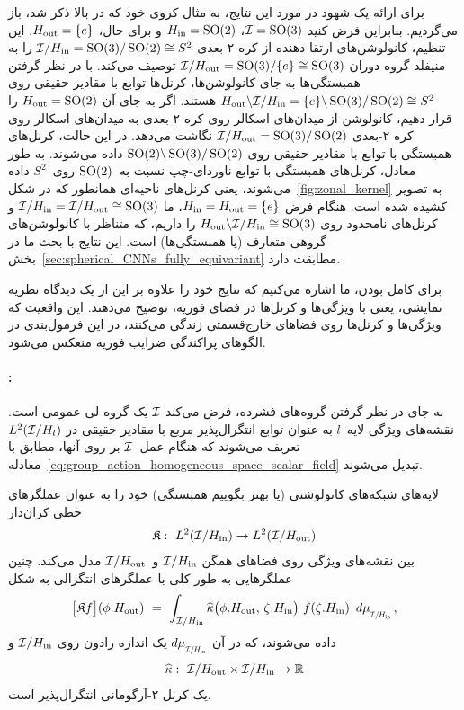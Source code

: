 برای ارائه یک شهود در مورد این نتایج، به مثال  کروی خود که در بالا ذکر شد، باز می‌گردیم.
بنابراین فرض کنید $\mathcal{I}=\operatorname{SO}(3)$، $H_{\textup{in}}=\operatorname{SO}(2)$ و برای حال، $H_{\textup{out}}=\{e\}$.
این تنظیم، کانولوشن‌های ارتقا دهنده از کره ۲-بعدی $\mathcal{I}/H_{\textup{in}} = \operatorname{SO}(3)/\operatorname{SO}(2) \cong S^2$ را به منیفلد گروه دوران $\mathcal{I}/H_{\textup{out}} = \operatorname{SO}(3)/\{e\} \cong \operatorname{SO}(3)$ توصیف می‌کند.
با در نظر گرفتن همبستگی‌ها به جای کانولوشن‌ها، کرنل‌ها توابع با مقادیر حقیقی روی $H_{\textup{out}}\backslash \mathcal{I}/H_{\textup{in}} = \{e\}\backslash \operatorname{SO}(3)/\operatorname{SO}(2) \cong S^2$ هستند.
اگر به جای آن $H_{\textup{out}}=\operatorname{SO}(2)$ را قرار دهیم، کانولوشن از میدان‌های اسکالر روی کره ۲-بعدی به میدان‌های اسکالر روی کره ۲-بعدی $\mathcal{I}/H_{\textup{out}} = \operatorname{SO}(3)/\operatorname{SO}(2)$ نگاشت می‌دهد.
در این حالت، کرنل‌های همبستگی با توابع با مقادیر حقیقی روی $\operatorname{SO}(2)\backslash \operatorname{SO}(3)/\operatorname{SO}(2)$ داده می‌شوند.
به طور معادل، کرنل‌های همبستگی با توابع ناوردای-چپ نسبت به~$\operatorname{SO}(2)$ روی~$S^2$ داده می‌شوند، یعنی کرنل‌های ناحیه‌ای همانطور که در شکل~\ref{fig:zonal_kernel} به تصویر کشیده شده است.
هنگام فرض $H_{\textup{in}}=H_{\textup{out}}=\{e\}$، ما $\mathcal{I}/H_{\textup{in}} = \mathcal{I}/H_{\textup{out}} \cong \operatorname{SO}(3)$ و کرنل‌های نامحدود روی $H_{\textup{out}}\backslash \mathcal{I}/H_{\textup{in}} \cong \operatorname{SO}(3)$ را داریم، که متناظر با کانولوشن‌های گروهی متعارف (یا همبستگی‌ها) است.
این نتایج با بحث ما در بخش~\ref{sec:spherical_CNNs_fully_equivariant} مطابقت دارد.


برای کامل بودن، ما اشاره می‌کنیم که \citet{Kondor2018-GENERAL} نتایج خود را علاوه بر این از یک دیدگاه نظریه نمایشی، یعنی با ویژگی‌ها و کرنل‌ها در فضای فوریه، توضیح می‌دهند.
این واقعیت که ویژگی‌ها و کرنل‌ها روی فضاهای خارج‌قسمتی زندگی می‌کنند، در این فرمول‌بندی در الگوهای پراکندگی ضرایب فوریه منعکس می‌شود.








\paragraph{\citet{bekkers2020bspline}:}

به جای در نظر گرفتن گروه‌های فشرده، \citet{bekkers2020bspline} فرض می‌کند $\mathcal{I}$ یک گروه لی عمومی است.
نقشه‌های ویژگی لایه~$l$ به عنوان توابع انتگرال‌پذیر مربع با مقادیر حقیقی در $L^2(\mathcal{I}/H_l)$ تعریف می‌شوند
که هنگام عمل~$\mathcal{I}$ بر روی آنها، مطابق با معادله~\eqref{eq:group_action_homogeneous_space_scalar_field} تبدیل می‌شوند.

\citet{bekkers2020bspline} لایه‌های شبکه‌های کانولوشنی (یا بهتر بگوییم همبستگی) خود را به عنوان عملگرهای خطی کران‌دار
\begin{align}
	\mathfrak{K}:\ L^2(\mathcal{I}/H_{\textup{in}}) \to L^2(\mathcal{I}/H_{\textup{out}})
\end{align}
بین نقشه‌های ویژگی روی فضاهای همگن $\mathcal{I}/H_{\textup{in}}$ و~$\mathcal{I}/H_{\textup{out}}$ مدل می‌کند.
چنین عملگرهایی به طور کلی با عملگرهای انتگرالی به شکل
\begin{align}
	\big[\mathfrak{K}f\big] (\phi.\Hout)\ =\ 
	\int_{\I/\Hin} \widehat{\kappa} \big(\phi.\Hout,\, \zeta.\Hin \big)\ f(\zeta.\Hin)\,\ \dmuIHin \,,
\end{align}
داده می‌شوند، که در آن $\dmuIHin$ یک اندازه رادون روی $\mathcal{I}/H_{\textup{in}}$ و
\begin{align}
	\widehat{\kappa}:\ \mathcal{I}/H_{\textup{out}} \times \mathcal{I}/H_{\textup{in}} \to \mathbb{R}
\end{align}
یک کرنل ۲-آرگومانی انتگرال‌پذیر است.


